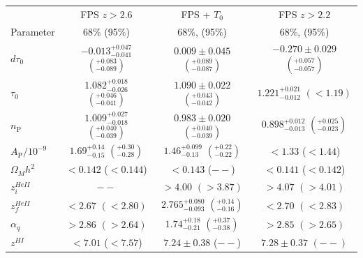 \begin{table}
	\centering
      \def\arraystretch{1.6}
\begin{tabular} {| l | c | c | c|}
\hline
 & FPS $z>2.6$ & FPS + $T_0$ & FPS $z>2.2$ \\
Parameter & 68\% (95\%) & 68\%, (95\%) & 68\%, (95\%)
\\
\hline
$d\tau_0        $ & $-0.013^{+0.047}_{-0.041}$  $\left(^{+0.083}_{-0.089}\right)$                   & $0.009\pm 0.045$            $\left(^{+0.089}_{-0.087}\right)$                   & $-0.270\pm 0.029$     $\left(^{+0.057}_{-0.057}  \right)$   \\
$\tau_0         $ & $1.082^{+0.018}_{-0.026}$  $\left(^{+0.046}_{-0.041}\right)$            & $1.090\pm 0.022$       $\left(^{+0.043}_{-0.042}\right)$                   & $1.221^{+0.021}_{-0.012}$   $(< 1.19)$   \\
$n_\mathrm{P}   $ & $1.009^{+0.027}_{-0.018}$  $\left(^{+0.040}_{-0.039}\right)$  & $0.983\pm 0.020$  $\left(^{+0.040}_{-0.039}\right)$    & $0.898^{+0.012}_{-0.013}$            $\left(^{+0.025}_{-0.023}\right)$   \\
$A_\mathrm{P}/10^{-9}$ & $1.69^{+0.14}_{-0.15}$        $\left(^{+0.30}_{-0.28}\right)$        & $1.46^{+0.099}_{-0.13}$   $\left(^{+0.22}_{-0.22}\right)$                   &           $< 1.33 $  ($< 1.44$)   \\
$\Omega_M h^2   $ & $< 0.142$ ($< 0.144$)                                              & $< 0.143$  ($--$)                                                                  & $< 0.141$ ($< 0.142$)   \\
$z^{HeII}_i     $ & $--                    $                                           & $> 4.00$   $(> 3.87 ) $                                                            & $> 4.07                    $  $(> 4.01)$   \\
$z^{HeII}_f     $ & $< 2.67                    $  $(< 2.80)$                   & $2.765^{+0.080}_{-0.093}$  $\left(^{+0.14}_{-0.16}\right)$           & $< 2.70                    $    $(< 2.83 )$   \\
$\alpha_{q}     $ & $> 2.86                    $  $(> 2.64)$                   & $1.74^{+0.18}_{-0.21}$  $\left(^{+0.37}_{-0.38}\right)$              & $> 2.85                    $    $(> 2.65 )                   $   \\
$z^{HI}         $ & $< 7.01                    $ ($< 7.57$)                    & $ 7.24\pm 0.38$ ($--$)                            & $7.28\pm 0.37$    $(--)$   \\

\end{tabular}
\end{table}
